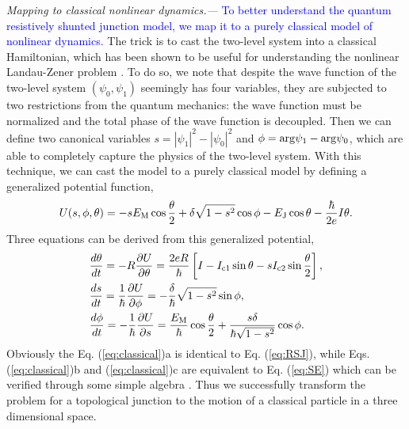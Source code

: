 \documentclass[aps,prl,twocolumn,showpacs,showpacs,10pt,superscriptaddress]{revtex4-1}
\newcommand{\blue}[1]{\textcolor{blue}{#1}}
\begin{document}
{\it Mapping to classical nonlinear dynamics.---}
\blue{To better understand the quantum resistively shunted junction model, we map it to a purely classical model of nonlinear dynamics.} The trick is to cast the two-level system into a classical Hamiltonian, which has been shown to be useful for understanding the nonlinear Landau-Zener problem \cite{Liu02,Liu03}. To do so, we note that despite the wave function of the two-level system $(\psi_0,\psi_1)$ seemingly has four variables, they are subjected to two restrictions from the quantum mechanics: the wave function must be normalized and the total phase of the wave function is decoupled. Then we can define two canonical variables $s = |\psi_1|^2 - |\psi_0|^2$ and $\phi = {\rm arg}\psi_1 - {\rm arg}\psi_0$, which are able to completely capture the physics of the two-level system. With this technique, we can cast the model to a purely classical model by defining a generalized potential function,
\begin{equation}
U (s,\phi,\theta)= -s E_{\rm M}  \cos \frac{\theta}{2} + \delta \sqrt{1-s^2} \cos \phi  -E_{\rm J} \cos \theta - \frac{\hbar}{2e} I \theta.
\end{equation}
Three equations can be derived from this generalized potential,
\begin{subequations}\label{eq:classical}
\begin{align}
&\frac{d\theta}{dt} = - R \frac {\partial U}{\partial \theta}  =  \frac{2eR}{\hbar} \left[I - I_{\rm c1}\sin{\theta} - s I_{\rm c2}  \sin{\frac{\theta}{2}}\right] ,
\\
&\frac{ds}{dt} = \frac{1}{\hbar} \frac {\partial U}{\partial \phi} = -\frac{\delta}{\hbar} \sqrt{1-s^2} \sin \phi ,
\\
& \frac{d\phi}{dt} = - \frac{1}{\hbar} \frac{\partial U}{ \partial s} =  \frac{E_{\rm M}}{\hbar}\cos \frac{\theta}{2} + \frac{s \delta }{\hbar \sqrt{1-s^2}}  \cos \phi.
\end{align}
\end{subequations}
Obviously the Eq. (\ref{eq:classical})a is identical to Eq. (\ref{eq:RSJ}), while Eqs. (\ref{eq:classical})b and (\ref{eq:classical})c are equivalent to Eq. (\ref{eq:SE}) which can be verified through some simple algebra \cite{supplement}. Thus we successfully transform the problem for a topological junction to the motion of a classical particle in a three dimensional space.
\end{document}
